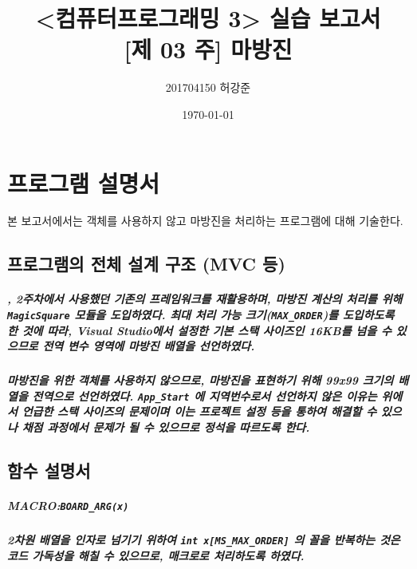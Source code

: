 \documentclass[UTF8]{report}
\title{%
    <컴퓨터프로그래밍 3> 실습 보고서 \\ 
    \large [제 03 주] 마방진}
\author{201704150 허강준}
\date{\today}
\begin{document}
    \maketitle
    \tableofcontents

    \chapter{프로그램 설명서}
        본 보고서에서는 객체를 사용하지 않고 마방진을 처리하는 프로그램에 대해 기술한다.

        \section{프로그램의 전체 설계 구조 (MVC 등)}
            
            \paragraph{%
                , 2주차에서 사용했던 기존의 프레임워크를 재활용하며, 마방진 계산의 처리를 위해 \texttt{MagicSquare} 모듈을 도입하였다. 최대 처리 가능 크기(\texttt{MAX\_ORDER})를 도입하도록 한 것에 따라, Visual Studio에서 설정한 기본 스택 사이즈인 16KB를 넘을 수 있으므로 전역 변수 영역에 마방진 배열을 선언하였다.
            }

            \paragraph{%
                \normalfont 마방진을 위한 객체를 사용하지 않으므로, 마방진을 표현하기 위해 99x99 크기의 배열을 전역으로 선언하였다. \texttt{App\_Start} 에 지역번수로서 선언하지 않은 이유는 위에서 언급한 스택 사이즈의 문제이며 이는 프로젝트 설정 등을 통하여 해결할 수 있으나 채점 과정에서 문제가 될 수 있으므로 정석을 따르도록 한다.
            }
            
        \section{함수 설명서}

            \paragraph{MACRO:\texttt{BOARD\_ARG(x)}}
            \paragraph{%
                \normalfont 2차원 배열을 인자로 넘기기 위하여 \texttt{int x[MS\_MAX\_ORDER]} 의 꼴을 반복하는 것은 코드 가독성을 해칠 수 있으므로, 매크로로 처리하도록 하였다.
            }
            
\end{document}
